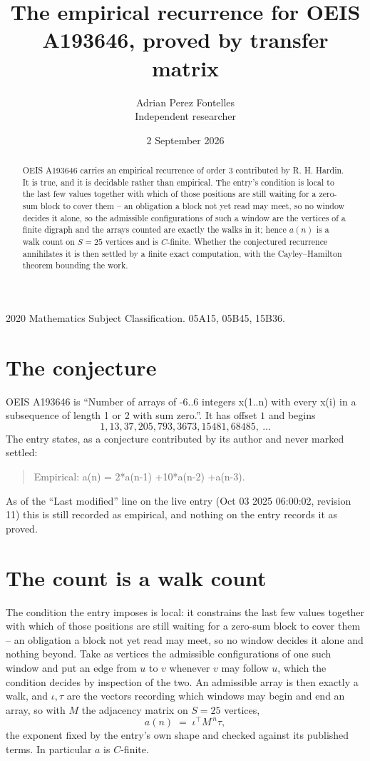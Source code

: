 \documentclass[11pt,a4paper]{article}
\title{The empirical recurrence for OEIS A193646, proved by transfer matrix}
\author{Adrian Perez Fontelles\\ \small Independent researcher}
\date{2 September 2026}
\theoremstyle{plain}
\theoremstyle{definition}
\begin{document}
\maketitle

\begin{abstract}
OEIS A193646 carries an empirical recurrence of order $3$ contributed by R. H. Hardin. It is
true, and it is decidable rather than empirical. The entry's condition is local to the last few values together with which of those positions are still waiting for a zero-sum block to cover them -- an obligation a block not yet read may meet, so no window decides it alone, so
the admissible configurations of such a window are the vertices of a finite digraph and the
arrays counted are exactly the walks in it; hence $a(n)$ is a walk count on $S=25$ vertices
and is $C$-finite. Whether the conjectured recurrence annihilates it is then settled by a
finite exact computation, with the Cayley--Hamilton theorem bounding the work.
\end{abstract}

\noindent\small 2020 Mathematics Subject Classification. 05A15, 05B45, 15B36.\normalsize

\section{The conjecture}

OEIS A193646 is ``Number of arrays of -6..6 integers x(1..n) with every x(i) in a subsequence of length 1 or 2 with sum zero.''. It has offset $1$ and begins
\[
1, 13, 37, 205, 793, 3673, 15481, 68485,\ \dots
\]
The entry states, as a conjecture contributed by its author and never marked settled:
\begin{quote}
Empirical: a(n) = 2*a(n-1) +10*a(n-2) +a(n-3).
\end{quote}
As of the ``Last modified'' line on the live entry (Oct 03 2025 06:00:02, revision 11) this is still
recorded as empirical, and nothing on the entry records it as proved.

\section{The count is a walk count}

The condition the entry imposes is local: it constrains the last few values together with which of those positions are still waiting for a zero-sum block to cover them -- an obligation a block not yet read may meet, so no window decides it alone and nothing beyond. Take as vertices the admissible configurations of one such window and put an edge from $u$ to $v$ whenever $v$ may follow $u$, which the condition decides by inspection of the two.
An admissible array is then exactly a walk, and $\iota,\tau$ are the vectors recording which windows may begin and end an array, so with $M$ the adjacency matrix on $S=25$ vertices,
\[
a(n)\;=\;\iota^{\!\top}M^{\,n}\tau ,
\]
the exponent fixed by the entry's own shape and checked against its published terms. In
particular $a$ is $C$-finite.
\end{document}
